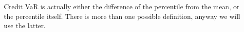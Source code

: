 Credit VaR is actually either the difference of the percentile from the mean, or the percentile itself. There is more than one possible definition, anyway we  will use the latter.

%
%
%
% 
%
%
